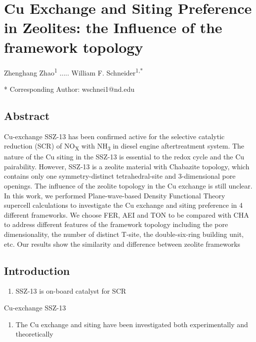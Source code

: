 \documentclass[12pt]{article}
\begin{document}
\section*{Cu Exchange and Siting Preference in Zeolites: the Influence of the framework topology}

Zhenghang Zhao\textsuperscript{1} ..... William F. Schneider\textsuperscript{1,*}

{\small
{}
* Corresponding Author: wschnei1@nd.edu 
}                     

\subsection*{Abstract}

Cu-exchange SSZ-13 has been confirmed active for the selective catalytic reduction (SCR) of NO\textsubscript{X} with NH\textsubscript{3} in diesel engine aftertreatment system. The nature of the Cu siting in the SSZ-13 is essential to the redox cycle and the Cu pairability. However, SSZ-13 is a zeolite material with Chabazite topology, which contains only one symmetry-distinct tetrahedral-site and 3-dimensional pore openings. The influence of the zeolite topology in the Cu exchange is still unclear. In this work, we performed Plane-wave-based Density Functional Theory supercell calculations to investigate the Cu exchange and siting preference in 4 different frameworks. We choose FER, AEI and TON to be compared with CHA to address different features of the framework topology including the pore dimensionality, the number of distinct T-site, the double-six-ring building unit, etc. Our results show the similarity and difference between zeolite frameworks

\subsection*{Introduction}
\begin{enumerate}
\item SSZ-13 is on-board catalyst for SCR
\end{enumerate}
Cu-exchange SSZ-13
 
\begin{enumerate}[resume]
\item The Cu exchange and siting have been investigated both experimentally and theoretically
\end{enumerate}
\end{document}

